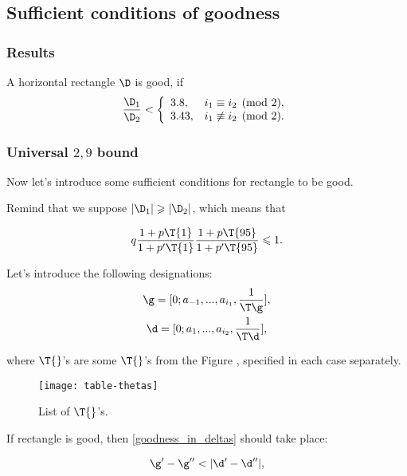 \subsection{Sufficient conditions of goodness}

\subsubsection{Results}

A horizontal rectangle $\D$ is good, if
\begin{equation}\label{goodness_condition}
	\dfrac{\D_1}{\D_2} <
	\left\{\begin{array}{ll}
		3.8, & i_1 \equiv i_2 \pmod 2,\\
		3.43, & i_1 \not\equiv i_2 \pmod 2.
	\end{array}\right.
\end{equation}

\subsubsection{Universal $2,9$ bound}

Now let's introduce some sufficient conditions for rectangle to be good.

Remind that we suppose $|\D_1| \geqslant |\D_2|$, which means that

\begin{equation*}
	q
	\dfrac{1 + p \T{1}}{1 + p' \T{1}}
	\dfrac{1 + p \T{95}}{1 + p' \T{95}} \leqslant 1.
\end{equation*}

Let's introduce the following designations:
\begin{gather*}
	\g = [0; a_{-1}, ..., a_{i_1}, \frac{1}{\T\g}], \\
	\d = [0; a_{1}, ..., a_{i_2}, \frac{1}{\T\d}],
\end{gather*}

where $\T{}$'s are some $\T{}$'s from the Figure ,
specified in each case separately.

\begin{figure}[p]
	\texttt{[image: table-thetas]}
	\caption{List of $\T{}$'s.}
	\label{fg:table-thetas}
\end{figure}

If rectangle is good, then \ref{goodness_in_deltas} should take place:

\begin{equation}\label{goodness_in_deltas}
	\g' - \g'' < |\d' - \d''|,
\end{equation}

